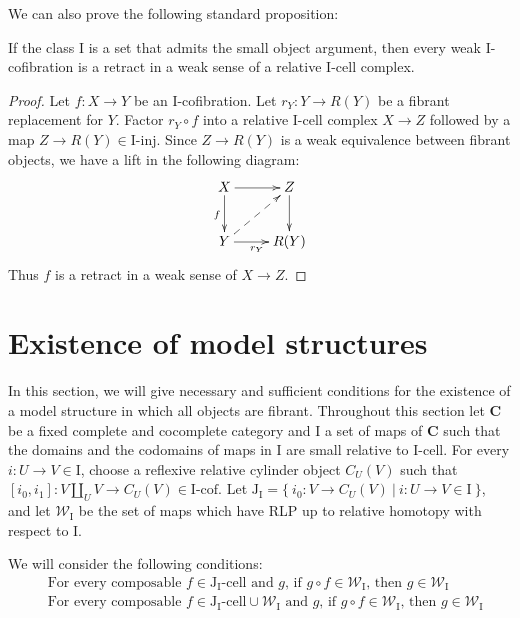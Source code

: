 \documentclass{tac}
\theoremstyle{definition}
\newcommand{\we}{\mathcal{W}}
\newcommand{\cat}[1]{\mathbf{#1}}
\newcommand{\C}{\cat{C}}
\newcommand{\I}{\mathrm{I}}
\newcommand{\J}{\mathrm{J}}
\newcommand{\class}[2]{#1\text{-}\mathrm{#2}}
\newcommand{\Iinj}[1][\I]{\class{#1}{inj}}
\newcommand{\Icell}[1][\I]{\class{#1}{cell}}
\newcommand{\Icof}[1][\I]{\class{#1}{cof}}
\newcommand{\Jcell}[1][]{\Icell[\J#1]}
\newcommand{\cyli}{i}
\begin{document}
We can also prove the following standard proposition:

\begin{prop}
If the class $\I$ is a set that admits the small object argument, then every weak $\I$-cofibration is a retract in a weak sense of a relative $\I$-cell complex.
\end{prop}
\begin{proof}
Let $f : X \to Y$ be an $\I$-cofibration.
Let $r_Y : Y \to R(Y)$ be a fibrant replacement for $Y$.
Factor $r_Y \circ f$ into a relative $\I$-cell complex $X \to Z$ followed by a map $Z \to R(Y) \in \Iinj$.
Since $Z \to R(Y)$ is a weak equivalence between fibrant objects, we have a lift in the following diagram:
\[ \xymatrix{ X \ar[r] \ar[d]_f             & Z \ar[d] \\
              Y \ar[r]_{r_Y} \ar@{-->}[ur]  & R(Y)
            } \]
Thus $f$ is a retract in a weak sense of $X \to Z$.
\end{proof}

\section{Existence of model structures}

In this section, we will give necessary and sufficient conditions for the existence of a model structure in which all objects are fibrant.
Throughout this section let $\C$ be a fixed complete and cocomplete category and $\I$ a set of maps of $\C$
such that the domains and the codomains of maps in $\I$ are small relative to $\Icell$.
For every $i : U \to V \in \I$, choose a reflexive relative cylinder object $C_U(V)$
such that $[\cyli_0,\cyli_1] : V \amalg_U V \to C_U(V) \in \Icof$.
Let $\J_\I = \{\ \cyli_0 : V \to C_U(V)\ |\ i : U \to V \in \I \ \}$, and
let $\we_\I$ be the set of maps which have RLP up to relative homotopy with respect to $\I$.

We will consider the following conditions:
\begin{align}
& \text{For every composable $f \in \Jcell[_\I]$ and $g$, if $g \circ f \in \we_\I$, then $g \in \we_\I$} \label{cond:main} \tag{*} \\
& \text{For every composable $f \in \Jcell[_\I] \cup \we_\I$ and $g$, if $g \circ f \in \we_\I$, then $g \in \we_\I$} \label{cond:strong-main} \tag{*'}
\end{align}
\end{document}
